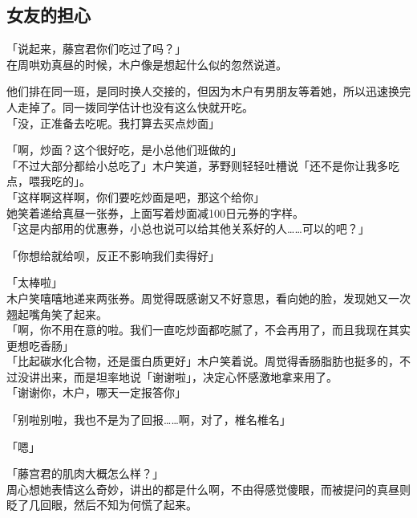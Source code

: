 \subsection{女友的担心}

「说起来，藤宫君你们吃过了吗？」\\

在周哄劝真昼的时候，木户像是想起什么似的忽然说道。

他们排在同一班，是同时换人交接的，但因为木户有男朋友等着她，所以迅速换完人走掉了。同一拨同学估计也没有这么快就开吃。\\

「没，正准备去吃呢。我打算去买点炒面」

「啊，炒面？这个很好吃，是小总他们班做的」\\

「不过大部分都给小总吃了」木户笑道，茅野则轻轻吐槽说「还不是你让我多吃点，喂我吃的」。\\

「这样啊这样啊，你们要吃炒面是吧，那这个给你」\\

她笑着递给真昼一张券，上面写着炒面减100日元券的字样。\\

「这是内部用的优惠券，小总也说可以给其他关系好的人……可以的吧？」

「你想给就给呗，反正不影响我们卖得好」

「太棒啦」\\

木户笑嘻嘻地递来两张券。周觉得既感谢又不好意思，看向她的脸，发现她又一次翘起嘴角笑了起来。\\

「啊，你不用在意的啦。我们一直吃炒面都吃腻了，不会再用了，而且我现在其实更想吃香肠」\\

「比起碳水化合物，还是蛋白质更好」木户笑着说。周觉得香肠脂肪也挺多的，不过没讲出来，而是坦率地说「谢谢啦」，决定心怀感激地拿来用了。\\

「谢谢你，木户，哪天一定报答你」

「别啦别啦，我也不是为了回报……啊，对了，椎名椎名」

「嗯」

「藤宫君的肌肉大概怎么样？」\\

周心想她表情这么奇妙，讲出的都是什么啊，不由得感觉傻眼，而被提问的真昼则眨了几回眼，然后不知为何慌了起来。\\

